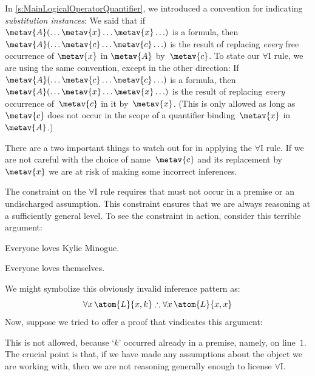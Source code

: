 In \cref{s:MainLogicalOperatorQuantifier}, we introduced a convention
for indicating \emph{substitution instances}: We said that if
$\metav{A}(\ldots \metav{x} \ldots \metav{x}\ldots)$ is a formula,
then $\metav{A}(\ldots \metav{c} \ldots \metav{c}\ldots)$ is the
result of replacing \emph{every} free occurrence of $\metav{x}$ in
$\metav{A}$ by~$\metav{c}$. To state our $\forall$I rule, we are using
the same convention, except in the other direction: If
$\metav{A}(\ldots \metav{c} \ldots \metav{c}\ldots)$ is a formula,
then $\metav{A}(\ldots \metav{x} \ldots \metav{x}\ldots)$ is the
result of replacing \emph{every} occurrence of~$\metav{c}$ in it
by~$\metav{x}$. (This is only allowed as long as $\metav{c}$ does not
occur in the scope of a quantifier binding~$\metav{x}$ in~$\metav{A}$.)

There are a two important things to watch out for in applying the
$\forall$I rule. If we are not careful with the choice of
name~$\metav{c}$ and its replacement by~$\metav{x}$ we are at risk of
making some incorrect inferences.

The constraint on the $\forall$I rule requires that  must not
occur in a premise or an undischarged assumption. This constraint
ensures that we are always reasoning at a sufficiently general level.
To see the constraint in action, consider this terrible argument:
	\begin{earg}
		\item Everyone loves Kylie Minogue.
		\item[\texttherefore] Everyone loves themselves.
	\end{earg}
We might symbolize this obviously invalid inference pattern as:
$$\forall x\,\atom{L}{x,k} \therefore \forall x\,\atom{L}{x,x}$$
Now, suppose we tried to offer a proof that vindicates this argument:
\begin{fitchproof}
	\PR
	 
	 
\end{fitchproof}
This is not allowed, because `$k$' occurred already in a premise, namely, on line~$1$. The crucial point is that, if we have made any assumptions about the object we are working with, then we are not reasoning generally enough to license $\forall$I.

